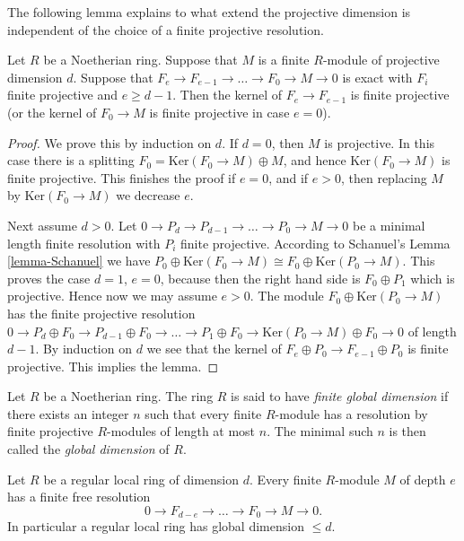 \noindent
The following lemma explains to what extend the projective
dimension is independent of the choice of a finite projective
resolution.

\begin{lemma}
\label{lemma-independent-resolution}
Let $R$ be a Noetherian ring.
Suppose that $M$ is a finite $R$-module
of projective dimension $d$.
Suppose that $F_e \to F_{e-1} \to \ldots \to F_0 \to M \to 0$
is exact with $F_i$ finite projective and $e \geq d - 1$.
Then the kernel of $F_e \to F_{e-1}$ is finite projective
(or the kernel of $F_0 \to M$ is finite projective in case
$e = 0$).
\end{lemma}

\begin{proof}
We prove this by induction on $d$. If $d = 0$, then
$M$ is projective. In this case there is a splitting
$F_0 = \text{Ker}(F_0 \to M) \oplus M$, and hence
$\text{Ker}(F_0 \to M)$ is finite projective. This finishes
the proof if $e = 0$, and if $e > 0$, then replacing
$M$ by $\text{Ker}(F_0 \to M)$ we decrease $e$.

\medskip\noindent
Next assume $d > 0$.
Let $0 \to P_d \to P_{d-1} \to \ldots \to P_0 \to M \to 0$
be a minimal length finite resolution with $P_i$ finite projective.
According to Schanuel's Lemma \ref{lemma-Schanuel} we have
$P_0 \oplus \text{Ker}(F_0 \to M) \cong F_0 \oplus \text{Ker}(P_0 \to M)$.
This proves the case $d = 1$, $e = 0$, because then the right
hand side is $F_0 \oplus P_1$ which is projective. Hence now we may
assume $e > 0$. The module
$F_0 \oplus \text{Ker}(P_0 \to M)$ has the finite projective resolution
$0 \to P_d \oplus F_0 \to P_{d-1} \oplus F_0 \to \ldots \to P_1 \oplus F_0
\to \text{Ker}(P_0 \to M) \oplus F_0 \to 0$ of length $d - 1$.
By induction on $d$ we see that the kernel of
$F_{e} \oplus P_0 \to F_{e-1} \oplus P_0$ is finite projective.
This implies the lemma.
\end{proof}

\begin{definition}
\label{definition-finite-gl-dim}
Let $R$ be a Noetherian ring. The ring
$R$ is said to have {\it finite global dimension}
if there exists an integer $n$ such that
every finite $R$-module has a resolution by finite
projective $R$-modules of length at most $n$.
The minimal such $n$ is then called the {\it global dimension}
of $R$.
\end{definition}

\begin{proposition}
\label{proposition-regular-finite-gl-dim}
Let $R$ be a regular local ring of dimension $d$.
Every finite $R$-module $M$ of depth $e$ has a finite free
resolution
$$
0 \to F_{d-e} \to \ldots \to F_0 \to M \to 0.
$$
In particular a regular local ring has global dimension $\leq d$.
\end{proposition}

